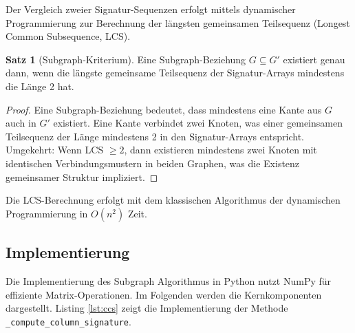 ﻿\documentclass[a4paper,12pt]{article}
\theoremstyle{definition}
\newtheorem{satz}{Satz}
\begin{document}
Der Vergleich zweier Signatur-Sequenzen erfolgt mittels dynamischer Programmierung zur Berechnung der längsten gemeinsamen Teilsequenz (Longest Common Subsequence, LCS).

\begin{satz}[Subgraph-Kriterium]
	Eine Subgraph-Beziehung $G \subseteq G'$ existiert genau dann, wenn die längste gemeinsame Teilsequenz der Signatur-Arrays mindestens die Länge 2 hat.
\end{satz}

\begin{proof}
	Eine Subgraph-Beziehung bedeutet, dass mindestens eine Kante aus $G$ auch in $G'$ existiert. Eine Kante verbindet zwei Knoten, was einer gemeinsamen Teilsequenz der Länge mindestens 2 in den Signatur-Arrays entspricht. Umgekehrt: Wenn LCS $\geq 2$, dann existieren mindestens zwei Knoten mit identischen Verbindungsmustern in beiden Graphen, was die Existenz gemeinsamer Struktur impliziert.
\end{proof}

Die LCS-Berechnung erfolgt mit dem klassischen Algorithmus der dynamischen Programmierung in $O(n^2)$ Zeit.

\subsection{Implementierung}

Die Implementierung des Subgraph Algorithmus in Python nutzt NumPy für effiziente Matrix-Operationen. Im Folgenden werden die Kernkomponenten dargestellt. Listing \ref{lst:ccs} zeigt die Implementierung der Methode \texttt{\_compute\_column\_signature}.
\end{document}
